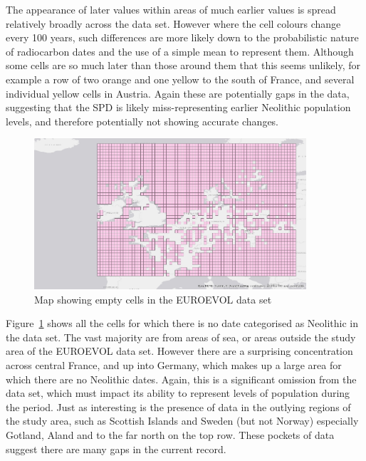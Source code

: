 The appearance of later values within areas of much earlier values is spread relatively broadly across the data set. However where the cell colours change every 100 years, such differences are more likely down to the probabilistic nature of radiocarbon dates and the use of a simple mean to represent them. Although some cells are so much later than those around them that this seems unlikely, for example a row of two orange and one yellow to the south of France, and several individual yellow cells in Austria. Again these are potentially gaps in the data, suggesting that the SPD is likely miss-representing earlier Neolithic population levels, and therefore potentially not showing accurate changes.

\begin{figure}
\begin{center}
	\includegraphics[width=0.9\textwidth]{figures/euroevol-null}
\end{center}
  \caption{Map showing empty cells in the EUROEVOL data set}
  \label{fig:euroevol-empty}
\end{figure}

Figure~\ref{fig:euroevol-empty} shows all the cells for which there is no date categorised as Neolithic in the data set. The vast majority are from areas of sea, or areas outside the study area of the EUROEVOL data set. However there are a surprising concentration across central France, and up into Germany, which makes up a large area for which there are no Neolithic dates. Again, this is a significant omission from the data set, which must impact its ability to represent levels of population during the period. Just as interesting is the presence of data in the outlying regions of the study area, such as Scottish Islands and Sweden (but not Norway) especially Gotland, Aland and to the far north on the top row. These pockets of data suggest there are many gaps in the current record.

